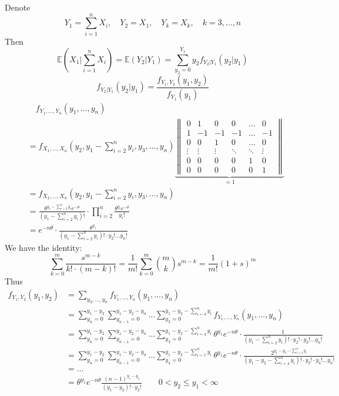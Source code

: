 Denote
\[
Y_1=\sum_{i=1}^{n} X_i,\quad Y_2=X_1,\quad Y_k=X_k,\quad k=3,\dots,n
\]
Then
\[
\mathbb{E}\left( X_1|\sum_{i=1}^{n} X_i \right)=\mathbb{E}(Y_2|Y_1)=\sum_{y_2=0}^{Y_1} y_2f_{Y_2|Y_1}(y_2|y_1)
\]
\[
f_{Y_2|Y_1}(y_2|y_1)=\frac{f_{Y_1,Y_2}(y_1,y_2)}{f_{Y_1}(y_1)}
\]
\[
\begin{aligned}
 & \quad f_{Y_1,\dots,Y_n}(y_1,\dots ,y_n) \\
 & =f_{X_1,\dots,X_n}\left( y_2,y_1-\sum_{i=2}^{n} y_i,y_3,\dots,y_n \right)\underbrace{ \begin{Vmatrix}
0 & 1 & 0 & 0 & \dots & 0 \\
1 & -1 & -1 & -1 & \dots & -1 \\
0 & 0 & 1 & 0 & \dots & 0 \\
\vdots & \vdots & \vdots & \ddots & \ddots & \vdots \\
0 & 0 & 0 & 0 & 1 & 0 \\
0 & 0 & 0 & 0 & 0 & 1
\end{Vmatrix} }_{ =1 } \\
 & =f_{X_1,\dots,X_n}\left( y_2,y_1-\sum_{i=2}^{n} y_i,y_3,\dots,y_n \right) \\
 & =\frac{\theta^{y_1-\sum_{i=2}^{n} y_i }e^{ -\theta }}{\left( y_1-\sum_{i=2}^{n} y_i \right)!}\cdot \prod_{i=2}^{n} \frac{\theta^{y_i}e^{ -\theta } }{y_i!} \\
 & =e^{ -n\theta }\cdot\frac{\theta^{y_1}}{\left( y_1-\sum_{i=2}^{n} y_i \right)!\cdot y_2!\dots  y_n!}
\end{aligned}
\]
We have the identity:
\[
\sum_{k=0}^{m} \frac{s^{m-k}}{k!\cdot(m-k)!}=\frac{1}{m!}\sum_{k=0}^{m}{\binom{m}{k} } s^{m-k}=\frac{1}{m!}(1+s)^{m}
\]
Thus
\[
\begin{aligned}
f_{Y_1,Y_2}(y_1,y_2) & =\sum_{y_3,\dots,y_n}f_{Y_1,\dots,Y_n}(y_1,\dots ,y_n) \\
 & =\sum_{y_n=0}^{y_1-y_2} \sum_{y_{n-1}=0}^{y_1-y_2-y_n} \dots \sum_{y_3=0}^{y_1-y_2-\sum_{i=4}^{n} y_i} f_{Y_1,\dots,Y_n}(y_1,\dots ,y_n) \\
 & =\sum_{y_n=0}^{y_1-y_2} \sum_{y_{n-1}=0}^{y_1-y_2-y_n} \dots \sum_{y_3=0}^{y_1-y_2-\sum_{i=4}^{n} y_i}\theta^{y_1}e^{ -n\theta }\cdot\frac{1}{\left( y_1-\sum_{i=2}^{n} y_i \right)!\cdot y_2!\cdot y_3!\dots  y_n!} \\
 & =\sum_{y_n=0}^{y_1-y_2} \sum_{y_{n-1}=0}^{y_1-y_2-y_n} \dots \sum_{y_4=0}^{y_1-y_2-\sum_{i=5}^{n} y_i}\theta^{y_1}e^{ -n\theta }\cdot\frac{2^{y_1-y_2-\sum_{i=4}^{n} y_i}}{\left( y_1-y_2-\sum_{i=4}^{n} y_i \right)!\cdot y_2!\cdot y_4!\dots  y_n!} \\
 & =\dots \\
 & =\theta^{y_1}e^{ -n\theta }\frac{(n-1)^{y_1-y_2}}{(y_1-y_2)!\cdot y_2!}\qquad 0<y_2\leq y_1<\infty
\end{aligned}
\]
